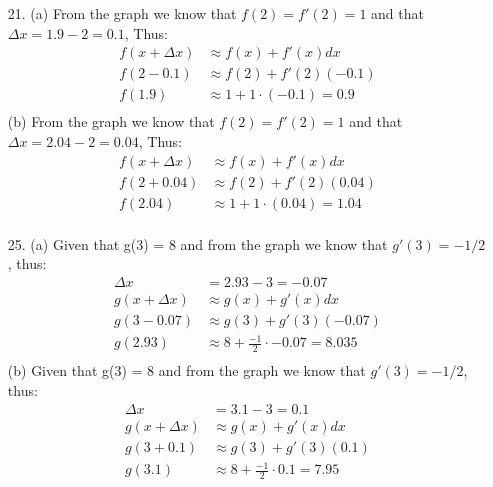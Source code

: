 \documentclass[12pt]{article}
\begin{document}
    \begin{enumerate}
        \item[21.] 
        (a) From the graph we know that $f(2) = f'(2) = 1$ and that $\Delta{x} = 1.9 - 2 = 0.1$, Thus:
            \begin{align*}
        	f(x + \Delta{x}) &\approx f(x) + f'(x)dx \\
        	f(2-0.1) &\approx f(2) + f'(2)(-0.1)\\
        	f(1.9) &\approx 1 + 1\cdot(-0.1) = 0.9\\
            \end{align*}
        (b) From the graph we know that $f(2) = f'(2) = 1$ and that $\Delta{x} = 2.04 - 2 = 0.04$, Thus:
            \begin{align*}
        	f(x + \Delta{x}) &\approx f(x) + f'(x)dx \\
        	f(2+0.04) &\approx f(2) + f'(2)(0.04)\\
        	f(2.04) &\approx 1 + 1\cdot(0.04) = 1.04\\
            \end{align*}
        \item[25.] 
        (a) Given that g(3) = 8 and from the graph we know that $g'(3) = -1/2$, thus:
            \begin{align*}
            \Delta{x} &= 2.93 - 3 = -0.07\\
        	g(x + \Delta{x}) &\approx g(x) + g'(x)dx \\
        	g(3-0.07) &\approx g(3) + g'(3)(-0.07)\\
        	g(2.93) &\approx 8 + \frac{-1}{2}\cdot -0.07 = 8.035\\
            \end{align*}
        (b) Given that g(3) = 8 and from the graph we know that $g'(3) = -1/2$, thus:
            \begin{align*}
            \Delta{x} &= 3.1 - 3 = 0.1\\
        	g(x + \Delta{x}) &\approx g(x) + g'(x)dx \\
        	g(3+0.1) &\approx g(3) + g'(3)(0.1)\\
        	g(3.1) &\approx 8 + \frac{-1}{2}\cdot 0.1 = 7.95\\
            \end{align*}
    \end{enumerate}
\end{document}
